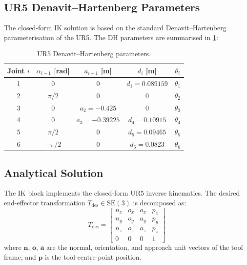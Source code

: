 \subsection{UR5 Denavit--Hartenberg Parameters}

The closed-form IK solution is based on the standard Denavit--Hartenberg parameterisation of the UR5.
The DH parameters are summarised in \cref{tab:dh}:

\begin{table}[H]
  \centering
  \caption{UR5 Denavit--Hartenberg parameters.}
  \label{tab:dh}
  \begin{tabular}{@{}ccccc@{}}
    \toprule
    Joint $i$ & $\alpha_{i-1}$ [rad] & $a_{i-1}$ [m] & $d_i$ [m] & $\theta_i$ \\
    \midrule
    1 & $0$         & $0$       & $d_1 = 0.089159$  & $\theta_1$ \\
    2 & $\pi/2$     & $0$       & $0$               & $\theta_2$ \\
    3 & $0$         & $a_2 = -0.425$   & $0$      & $\theta_3$ \\
    4 & $0$         & $a_3 = -0.39225$ & $d_4 = 0.10915$ & $\theta_4$ \\
    5 & $\pi/2$     & $0$       & $d_5 = 0.09465$   & $\theta_5$ \\
    6 & $-\pi/2$    & $0$       & $d_6 = 0.0823$    & $\theta_6$ \\
    \bottomrule
  \end{tabular}
\end{table}

\subsection{Analytical Solution}

The IK block implements the closed-form UR5 inverse kinematics.
The desired end-effector transformation $T_{\text{des}} \in \mathrm{SE}(3)$ is decomposed as:
\begin{equation}
  T_{\text{des}} = \begin{bmatrix}
    n_x & o_x & a_x & p_x \\
    n_y & o_y & a_y & p_y \\
    n_z & o_z & a_z & p_z \\
    0   & 0   & 0   & 1
  \end{bmatrix}
\end{equation}
where $\mathbf{n},\,\mathbf{o},\,\mathbf{a}$ are the normal, orientation, and approach unit vectors of the tool frame, and $\mathbf{p}$ is the tool-centre-point position.

